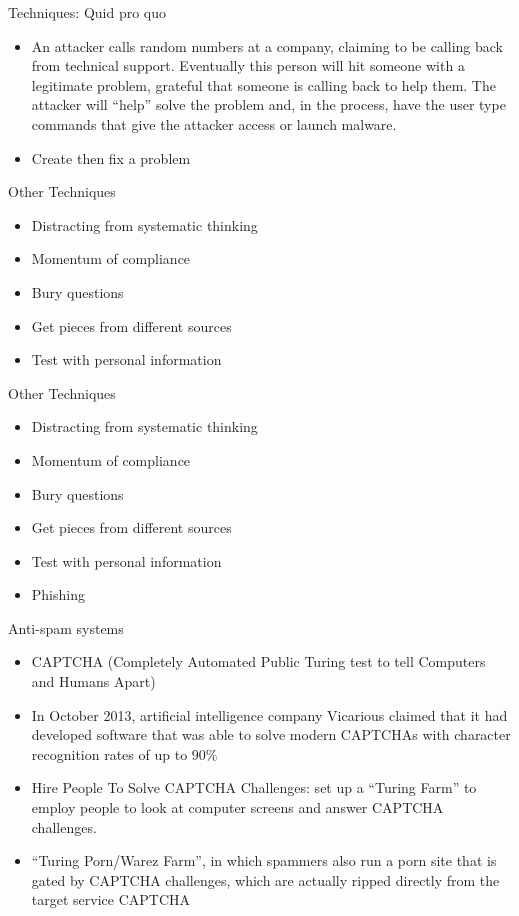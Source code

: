\documentclass{beamer}
\begin{document}
\begin{frame}{Techniques: Quid pro quo}
  
  \begin{itemize}
    \item An attacker calls random numbers at a company, claiming to
      be calling back from technical support. Eventually this person
      will hit someone with a legitimate problem, grateful that
      someone is calling back to help them. The attacker will ``help''
      solve the problem and, in the process, have the user type
      commands that give the attacker access or launch malware.
    \item Create then fix a problem
  \end{itemize}
\end{frame}

\begin{frame}{Other Techniques}
  \begin{itemize}
    \item Distracting from systematic thinking
    \item Momentum of compliance
    \item Bury questions
    \item Get pieces from different sources
    \item Test with personal information
  \end{itemize}
\end{frame}

\begin{frame}{Other Techniques}
  \begin{itemize}
    \item Distracting from systematic thinking
    \item Momentum of compliance
    \item Bury questions
    \item Get pieces from different sources
    \item Test with personal information
    \item Phishing
  \end{itemize}
\end{frame}

\begin{frame}{Anti-spam systems}
  \begin{itemize}
    \item CAPTCHA (Completely Automated Public Turing test to tell
      Computers and Humans Apart)
    \item In October 2013, artificial intelligence company Vicarious
      claimed that it had developed software that was able to solve
      modern CAPTCHAs with character recognition rates of up to $90\%$
    \item Hire People To Solve CAPTCHA Challenges: 
set up a ``Turing Farm'' to
employ people to look at computer screens and answer CAPTCHA
challenges. 
\item ``Turing Porn/Warez Farm'', in which spammers also run a porn site that is
  gated by CAPTCHA challenges, which are actually ripped directly from
  the target service CAPTCHA
  \end{itemize}
\end{frame}
\end{document}
